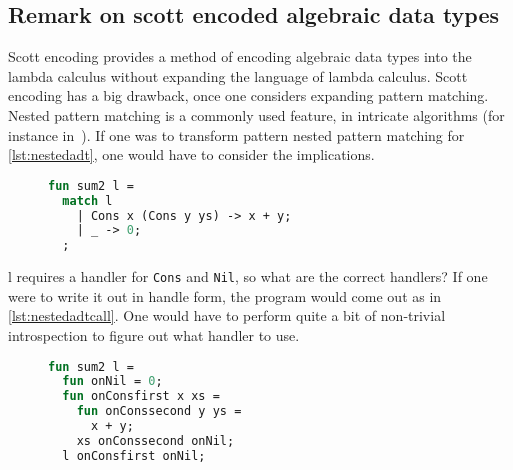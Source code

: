 \subsection{Remark on scott encoded algebraic data types}
Scott encoding provides a method of encoding algebraic data types into the lambda calculus without expanding the language of lambda calculus.
Scott encoding has a big drawback, once one considers expanding pattern matching.
Nested pattern matching is a commonly used feature, in intricate algorithms (for instance in~\cite{okasaki1999red}).
If one was to transform pattern nested pattern matching for \autoref{lst:nestedadt}, one would have to consider the implications.
\begin{figure}
\begin{lstlisting}[language=ML,caption={Nested pattern match},label={lst:nestedadt}]
fun sum2 l =
  match l
    | Cons x (Cons y ys) -> x + y;
    | _ -> 0;
  ;
\end{lstlisting}
\end{figure}
l requires a handler for \texttt{Cons} and \texttt{Nil}, so what are the correct handlers?
If one were to write it out in handle form, the program would come out as in \autoref{lst:nestedadtcall}.
One would have to perform quite a bit of non-trivial introspection to figure out what handler to use.
\begin{figure}
\begin{lstlisting}[language=ML,caption={Nested pattern match in handle form},label={lst:nestedadtcall}]
fun sum2 l =
  fun onNil = 0;
  fun onConsfirst x xs = 
    fun onConssecond y ys =
      x + y;
    xs onConssecond onNil;
  l onConsfirst onNil;
\end{lstlisting}
\end{figure}




